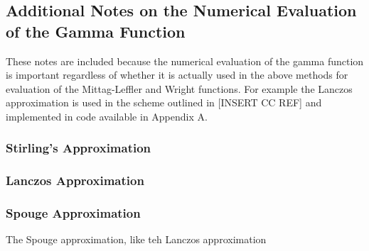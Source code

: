 \subsection{Additional Notes on the Numerical Evaluation of the Gamma Function}
\label{sec:num-gamma}
These notes are included because the numerical evaluation of the gamma function is important regardless of
whether it is actually used in the above methods for evaluation of the Mittag-Leffler and Wright functions.
For example the Lanczos approximation is used in the scheme outlined in [INSERT CC REF] and implemented 
in code available in Appendix A.

\subsubsection{Stirling's Approximation}

\subsubsection{Lanczos Approximation}

\subsubsection{Spouge Approximation}
The Spouge approximation, like teh Lanczos approximation 

\clearpage
